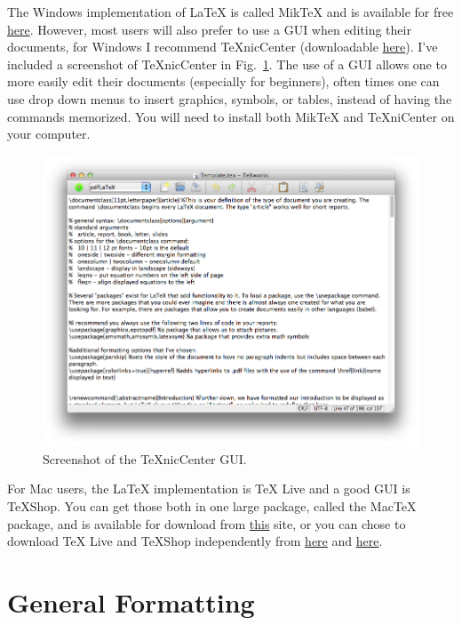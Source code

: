 \documentclass[11pt,letterpaper]{article} %
\begin{document}
The Windows implementation of \LaTeX{} is called Mik\TeX{} and is available for free \href{http://miktex.org/download}{here}. However, most users will also prefer to use a GUI when editing their documents, for Windows I recommend \TeX nicCenter (downloadable \href{http://www.texniccenter.org/resources/downloads/29}{here}). I've included a screenshot of \TeX nicCenter in Fig.~\ref{fig:TeXnicCenter Screenshot}. The use of a GUI allows one to more easily edit their documents (especially for beginners), often times one can use drop down menus to insert graphics, symbols, or tables, instead of having the commands memorized. You will need to install both Mik\TeX{} and \TeX niCenter on your computer.


\begin{figure}[ht]
\centering
\includegraphics[width = 5in]{screenshot.png}
\caption{Screenshot of the \TeX nicCenter GUI.}
\label{fig:TeXnicCenter Screenshot}
\end{figure}

For Mac users, the \LaTeX{} implementation is \TeX{} Live and a good GUI is \TeX Shop. You can get those both in one large package, called the Mac\TeX{} package, and is available for download from \href{http://pages.uoregon.edu/koch/texshop/obtaining.html}{this} site, or you can chose to download \TeX{} Live and \TeX Shop independently from \href{http://www.tug.org/texlive/}{here} and \href{http://pages.uoregon.edu/koch/texshop/obtaining.html}{here}.

\section{General Formatting}
\end{document}
